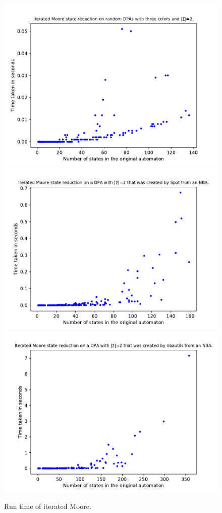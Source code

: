 \begin{figure}
	\centering
	\includegraphics[page=1,height=.3\textheight]{../data/analysis/iterated_moore/gendet_ap1.pdf} 
	\includegraphics[page=1,height=.3\textheight]{../data/analysis/iterated_moore/detspot_ap1.pdf} 
	\includegraphics[page=1,height=.3\textheight]{../data/analysis/iterated_moore/detnbaut_ap1.pdf} 
	\caption{Run time of iterated Moore.}
	\label{exp:fig:iterated_moore_time}
\end{figure}